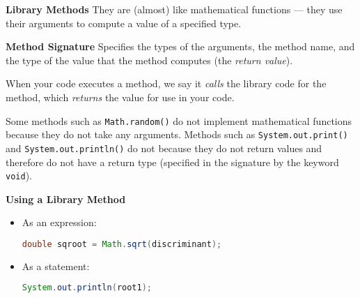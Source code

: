 \documentclass[8pt,a4paper,compress]{beamer}
\begin{document}
\begin{frame}[fragile]
\pause
\textbf{Library Methods} They are (almost) like mathematical functions --- they use their arguments to compute a value of a specified type. 

\pause
\smallskip

\textbf{Method Signature} Specifies the types of the arguments, the method name, and the type of the value that the method computes (the \textit{return value}). 

\pause
\smallskip

When your code executes a method, we say it \textit{calls} the library code for the method, which \textit{returns} the value for use in your code.

\pause
\smallskip

Some methods such as \lstinline$Math.random()$ do not implement  mathematical functions because they do not take any arguments. Methods such as \lstinline$System.out.print()$ and \lstinline$System.out.println()$ do not because they do not return values and therefore do not have a return type (specified in the signature by the keyword \lstinline$void$).

\pause
\smallskip

\textbf{Using a Library Method}
\begin{itemize}
\item As an expression:
\begin{lstlisting}[language=Java]
double sqroot = Math.sqrt(discriminant);
\end{lstlisting}

\item As a statement:
\begin{lstlisting}[language=Java]
System.out.println(root1);
\end{lstlisting}
\end{itemize}
\end{frame}
\end{document}
